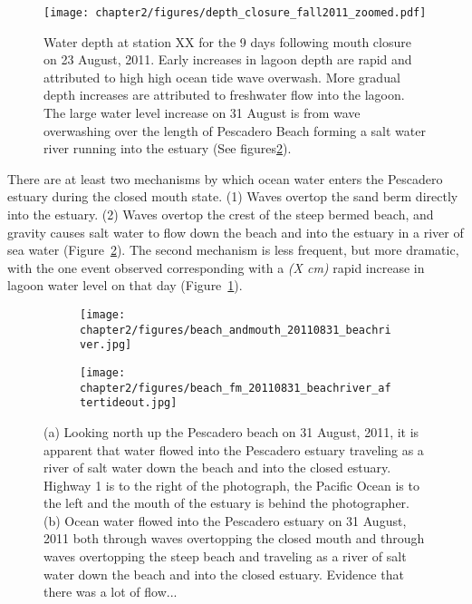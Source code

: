 \begin{figure}
\centering
		\texttt{[image: chapter2/figures/depth\_closure\_fall2011\_zoomed.pdf]} \caption{Water depth at station XX for the 9 days following mouth closure on 23 August, 2011. Early increases in lagoon depth are rapid and attributed to high high ocean tide wave overwash. More gradual depth increases are attributed to freshwater flow into the lagoon. The large water level increase on 31 August is from wave overwashing over the length of Pescadero Beach forming a salt water river running into the estuary (See figures\ref{fig:beachriver}).}
	\label{fig:depthclosuref11} 
\end{figure}


There are at least two mechanisms by which ocean water enters the Pescadero estuary during the closed mouth state. (1) Waves overtop the sand berm directly into the estuary. (2) Waves overtop the crest of the steep bermed beach, and gravity causes salt water to flow down the beach and into the estuary in a river of sea water (Figure~\ref{fig:beachriver}). The second mechanism is less frequent, but more dramatic, with the one event observed corresponding with a \emph{(X cm)} rapid increase in lagoon water level on that day (Figure~\ref{fig:depthclosuref11}).

\begin{figure}
\begin{subfigure}{.5\textwidth}
		\texttt{[image: chapter2/figures/beach\_andmouth\_20110831\_beachriver.jpg]}
\end{subfigure}
\begin{subfigure}{.5\textwidth}
		\texttt{[image: chapter2/figures/beach\_fm\_20110831\_beachriver\_aftertideout.jpg]}
\end{subfigure}   \caption{(a) Looking north up the Pescadero beach on 31 August, 2011, it is apparent that water flowed into the Pescadero estuary traveling as a river of salt water down the beach and into the closed estuary. Highway 1 is to the right of the photograph, the Pacific Ocean is to the left and the mouth of the estuary is behind the photographer. (b) Ocean water flowed into the Pescadero estuary on 31 August, 2011 both through waves overtopping the closed mouth and through waves overtopping the steep beach and traveling as a river of salt water down the beach and into the closed estuary. Evidence that there was a lot of flow...} 		 \label{fig:beachriver} 
 \end{figure}

